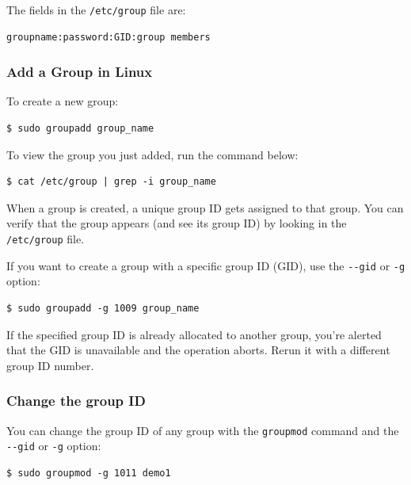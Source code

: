 \documentclass{article}
\newenvironment{blocktemplate}[1]{%
    \tcolorbox[beamer,%
    noparskip,breakable,
    colframe=Blue,%
    colbacklower=LimeGreen!75!LightGreen,%
    title=#1]}%
    {\endtcolorbox}
\newenvironment{blocktemplateIII}[1]{%
    \tcolorbox[beamer,%
    noparskip,breakable,
    ,colframe=Red,%
    colbacklower=LimeGreen!75!LightGreen,%
    title=#1]}%
    {\endtcolorbox}
\newenvironment{codetemplate}[1][]{%
  \mybasecolorbox[#1]
  \itshape
}{%
  \endmybasecolorbox
}
\begin{document}
The fields in the \verb|/etc/group| file are:
\begin{codetemplate}{}
\begin{verbatim}
groupname:password:GID:group members
\end{verbatim}
\end{codetemplate}

\subsubsection{Add a Group in Linux}
To create a new group:
\begin{codetemplate}{}
\begin{verbatim}
$ sudo groupadd group_name
\end{verbatim}
\end{codetemplate}

To view the group you just added, run the command below:
\begin{codetemplate}{}
\begin{verbatim}
$ cat /etc/group | grep -i group_name
\end{verbatim}
\end{codetemplate}

\begin{blocktemplate}{NOTE}
When a group is created, a unique group ID gets assigned to that group. You can verify that the group appears (and see its group ID) by looking in the \verb|/etc/group| file.
\end{blocktemplate}

If you want to create a group with a specific group ID (GID), use the \verb|--gid| or \verb|-g| option:

\begin{codetemplate}{}
\begin{verbatim}
$ sudo groupadd -g 1009 group_name
\end{verbatim}
\end{codetemplate}

\begin{blocktemplateIII}{WARNING}
If the specified group ID is already allocated to another group, you're alerted that the GID is unavailable and the operation aborts. Rerun it with a different group ID number.
\end{blocktemplateIII}

\subsubsection{Change the group ID}
You can change the group ID of any group with the \verb|groupmod| command and the \verb|--gid| or \verb|-g| option:
\begin{codetemplate}{}
\begin{verbatim}
$ sudo groupmod -g 1011 demo1
\end{verbatim}
\end{codetemplate}
\end{document}
